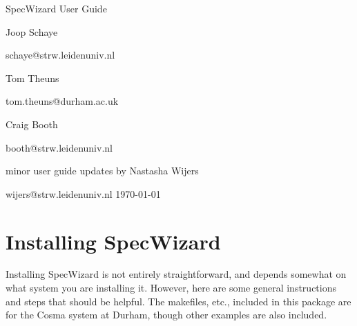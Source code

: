 \documentclass{report}
\begin{document}
\begin{center}
\thispagestyle{empty}
 
 \vspace{20cm}
\begin{Huge}SpecWizard User Guide\end{Huge}
\vspace{5cm}\linebreak

\begin{Large}Joop Schaye\linebreak\end{Large}
{\large schaye@strw.leidenuniv.nl}\vspace{0.5cm}\linebreak
\begin{Large}Tom Theuns\linebreak\end{Large}
{\large tom.theuns@durham.ac.uk}\vspace{0.5cm}\linebreak
\begin{Large}Craig Booth\linebreak\end{Large}
{\large booth@strw.leidenuniv.nl} \vspace{2cm}\linebreak
\begin{large}minor user guide updates by Nastasha Wijers\linebreak\end{large}
{wijers@strw.leidenuniv.nl}
\vspace{6cm}\linebreak
\today
\end{center}
\pagebreak
\tableofcontents

\chapter{Installing SpecWizard}

Installing SpecWizard is not entirely straightforward, and depends somewhat on what system you are installing it. However, here are some general instructions and steps that should be helpful. The makefiles, etc., included in this package are for the Cosma system at Durham, though other examples are also included.
\end{document}
